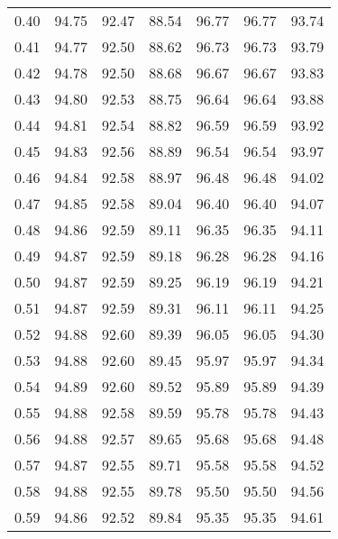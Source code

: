 \begin{tabular}{|c|c|c|c|c|c|c|}
      0.40 &     94.75 &     92.47 &      88.54 &   96.77 &      96.77 &         93.74 \\
      0.41 &     94.77 &     92.50 &      88.62 &   96.73 &      96.73 &         93.79 \\
      0.42 &     94.78 &     92.50 &      88.68 &   96.67 &      96.67 &         93.83 \\
      0.43 &     94.80 &     92.53 &      88.75 &   96.64 &      96.64 &         93.88 \\
      0.44 &     94.81 &     92.54 &      88.82 &   96.59 &      96.59 &         93.92 \\
      0.45 &     94.83 &     92.56 &      88.89 &   96.54 &      96.54 &         93.97 \\
      0.46 &     94.84 &     92.58 &      88.97 &   96.48 &      96.48 &         94.02 \\
      0.47 &     94.85 &     92.58 &      89.04 &   96.40 &      96.40 &         94.07 \\
      0.48 &     94.86 &     92.59 &      89.11 &   96.35 &      96.35 &         94.11 \\
      0.49 &     94.87 &     92.59 &      89.18 &   96.28 &      96.28 &         94.16 \\
      0.50 &     94.87 &     92.59 &      89.25 &   96.19 &      96.19 &         94.21 \\
      0.51 &     94.87 &     92.59 &      89.31 &   96.11 &      96.11 &         94.25 \\
      0.52 &     94.88 &     92.60 &      89.39 &   96.05 &      96.05 &         94.30 \\
      0.53 &     94.88 &     92.60 &      89.45 &   95.97 &      95.97 &         94.34 \\
      0.54 &     94.89 &     92.60 &      89.52 &   95.89 &      95.89 &         94.39 \\
      0.55 &     94.88 &     92.58 &      89.59 &   95.78 &      95.78 &         94.43 \\
      0.56 &     94.88 &     92.57 &      89.65 &   95.68 &      95.68 &         94.48 \\
      0.57 &     94.87 &     92.55 &      89.71 &   95.58 &      95.58 &         94.52 \\
      0.58 &     94.88 &     92.55 &      89.78 &   95.50 &      95.50 &         94.56 \\
      0.59 &     94.86 &     92.52 &      89.84 &   95.35 &      95.35 &         94.61 \\

\end{tabular}
